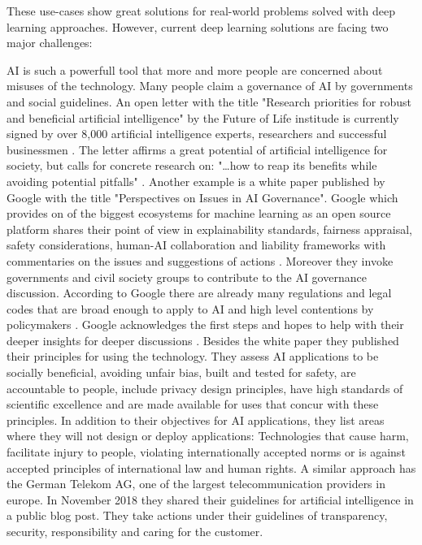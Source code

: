 These use-cases show great solutions for real-world problems solved with deep learning approaches.
However, current deep learning solutions are facing two major challenges:

AI is such a powerfull tool that more and more people are concerned about misuses of the technology.
Many people claim a governance of AI by governments and social guidelines.
An open letter with the title "Research priorities for robust and beneficial artificial intelligence" by the Future of Life institude is currently signed by over 8,000 artificial intelligence experts, researchers and successful businessmen \cite{futureoflife-ai-open-letter, futureoflife-research-priorities}.
The letter affirms a great potential of artificial intelligence for society, but calls for concrete research on: "…how to reap its benefits while avoiding potential pitfalls" \cite{futureoflife-ai-open-letter}.
Another example is a white paper published by Google with the title "Perspectives on Issues in AI Governance".
Google which provides on of the biggest ecosystems for machine learning as an open source platform shares their point of view in explainability standards, fairness appraisal, safety considerations, human-AI collaboration and liability frameworks with commentaries on the issues and suggestions of actions \cite{google-ai-governance}.
Moreover they invoke governments and civil society groups to contribute to the AI governance discussion.
According to Google there are already many regulations and legal codes that are broad enough to apply to AI and high level contentions by policymakers \cite[page 3]{google-ai-governance}.
Google acknowledges the first steps and hopes to help with their deeper insights for deeper discussions \cite[page 4]{google-ai-governance}.
\hfill \break
Besides the white paper they published their principles for using the technology.
They assess AI applications to be socially beneficial, avoiding unfair bias, built and tested for safety, are accountable to people, include privacy design principles, have high standards of scientific excellence and are made available for uses that concur with these principles.
In addition to their objectives for AI applications, they list areas where they will not design or deploy applications:
Technologies that cause harm, facilitate injury to people, violating internationally accepted norms or is against accepted principles of international law and human rights.
\cite{google-ai-principles}
\hfill \break
A similar approach has the German Telekom AG, one of the largest telecommunication providers in europe.
In November 2018 they shared their guidelines for artificial intelligence in a public blog post.
They take actions under their guidelines of transparency, security, responsibility and caring for the customer.
\cite{telekom-ai-guidelines}

